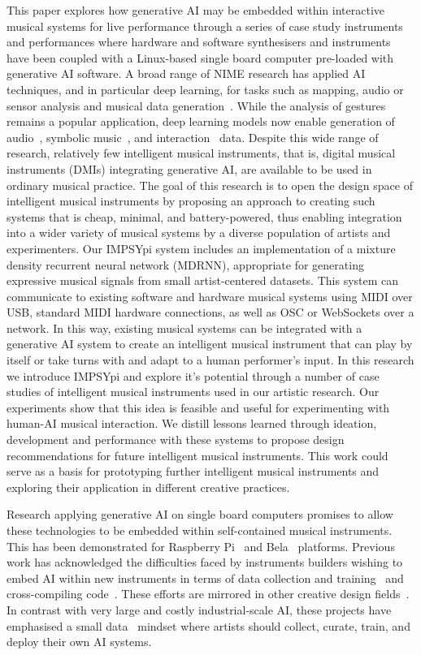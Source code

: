 \documentclass[manuscript,review,anonymous]{acmart}
\begin{document}
This paper explores how generative AI may be embedded within interactive musical systems for live performance through a series of case study instruments and performances where hardware and software synthesisers and instruments have been coupled with a Linux-based single board computer pre-loaded with generative AI software.
A broad range of NIME research has applied AI techniques, and in particular deep learning, for tasks such as mapping, audio or sensor analysis and musical data generation~\cite{jourdan_nime_ml_review}. While the analysis of gestures~\cite{visi_iml_gesture} remains a popular application, deep learning models now enable generation of audio~\cite{caillon_rave}, symbolic music~\cite{symbolicmusic2023}, and interaction~\cite{Martin2019} data.
Despite this wide range of research, relatively few intelligent musical instruments, that is, digital musical instruments (DMIs) integrating generative AI, are available to be used in ordinary musical practice.
The goal of this research is to open the design space of intelligent musical instruments by proposing an approach to creating such systems that is cheap, minimal, and battery-powered, thus enabling integration into a wider variety of musical systems by a diverse population of artists and experimenters. 
Our IMPSYpi system includes an implementation of a mixture density recurrent neural network (MDRNN), appropriate for generating expressive musical signals from small artist-centered datasets. 
This system can communicate to existing software and hardware musical systems using MIDI over USB, standard MIDI hardware connections, as well as OSC or WebSockets over a network.
In this way, existing musical systems can be integrated with a generative AI system to create an intelligent musical instrument that can play by itself or take turns with and adapt to a human performer's input.
In this research we introduce IMPSYpi and explore it's potential through a number of case studies of intelligent musical instruments used in our artistic research.
Our experiments show that this idea is feasible and useful for experimenting with human-AI musical interaction.
We distill lessons learned through ideation, development and performance with these systems to propose design recommendations for future intelligent musical instruments.
This work could serve as a basis for prototyping further intelligent musical instruments and exploring their application in different creative practices.

Research applying generative AI on single board computers promises to allow these technologies to be embedded within self-contained musical instruments. 
This has been demonstrated for Raspberry Pi~\cite{Naess:2019aa, martin_empi} and Bela~\cite{pelinski_pipeline_bela} platforms. 
Previous work has acknowledged the difficulties faced by instruments builders wishing to embed AI within new instruments in terms of data collection and training~\cite{Martin2019} and cross-compiling code~\cite{pelinski_pipeline_bela}. These efforts are  mirrored in other creative design fields~\cite{teachablemachine}.
In contrast with very large and costly industrial-scale AI, these projects have emphasised a small data~\cite{Vigliensoni:2022} mindset where artists should collect, curate, train, and deploy their own AI systems. 
\end{document}
